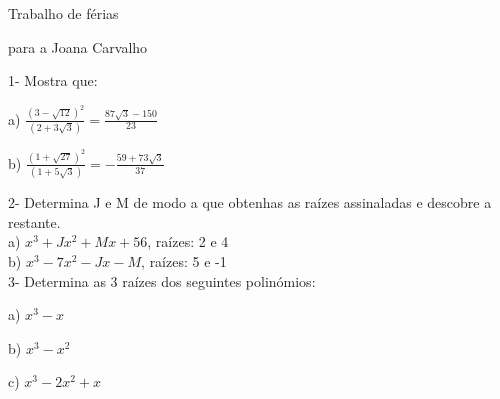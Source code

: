 \documentclass[11pt]{article}
\begin{document}
\begin{center}
{\huge Trabalho de férias}
\end{center}
\begin{center}
{\huge para a Joana Carvalho}
\end{center}
\vspace{10mm}

{\large 1- Mostra que:}\\
\begin{multicols}{2}
a) $ \frac {(3 - \sqrt{12})^{2} }  {(2 + 3 \sqrt{3} )}= \frac{87 \sqrt{3} - 150}{23}$

b) $ \frac {(1 + \sqrt{27})^{2} }  {(1 + 5 \sqrt{3} )}= -\frac{59 + 73 \sqrt{3}}{37}$
\end{multicols}

{\large 2- Determina J e M de modo a que obtenhas as raízes assinaladas e descobre a restante.}\\

a) $x^{3}+Jx^{2} + Mx+56$, raízes: 2 e 4\\

b) $x^3-7x^2-Jx-M$, raízes: 5 e -1\\

{\large 3- Determina as 3 raízes dos seguintes polinómios:}\\
\begin{multicols}{3}
a) $x^3-x$

b) $x^3-x^2$

c) $x^3-2x^2+x$
\end{multicols}
\end{document}
